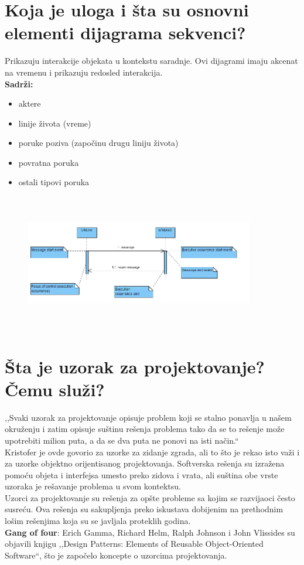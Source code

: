 \documentclass[a4paper]{article}
\begin{document}
\section{Koja je uloga i šta su osnovni elementi dijagrama sekvenci?}
  Prikazuju interakcije objekata u kontekstu saradnje. Ovi dijagrami imaju akcenat na vremenu i
  prikazuju redosled interakcija.\\
  \textbf{Sadrži:}
  \begin{itemize}
    \item aktere
    \item linije života (vreme)
    \item poruke poziva (započinu drugu liniju života)
    \item povratna poruka
    \item ostali tipovi poruka
  \end{itemize}
  \begin{figure}[H]
    \begin{center}
        \includegraphics[width=100mm,height=60mm]{Slike/uml_sekvenci.png}
    \end{center}
  \end{figure} 

\section{Šta je uzorak za projektovanje? Čemu služi?}
  ,,Svaki uzorak za projektovanje opisuje problem koji se stalno ponavlja u našem okruženju i zatim
  opisuje suštinu rešenja problema tako da se to rešenje može upotrebiti milion puta, a da se
  dva puta ne ponovi na isti način.`` 
  \\

  Kristofer je ovde govorio za uzorke za zidanje zgrada, ali to što je rekao isto važi i za
  uzorke objektno orijentisanog projektovanja. Softverska rešenja su izražena pomoću objeta i 
  interfejsa umesto preko zidova i vrata, ali suština obe vrste uzoraka je rešavanje problema
  u svom kontektsu.\\
  \indent Uzorci za projektovanje su rešenja za opšte probleme sa kojim se razvijaoci često susreću.
  Ova rešenja su sakupljenja preko iskustava dobijenim na prethodnim lošim rešenjima koja su
  se javljala proteklih godina.\\
  \indent \textbf{Gang of four}: Erich Gamma, Richard Helm, Ralph Johnson i John Vlissides su objavili
  knjigu ,,Design Patterns: Elements of Reusable Object-Oriented Software``, što je započelo 
  koncepte o uzorcima projektovanja.
\end{document}
